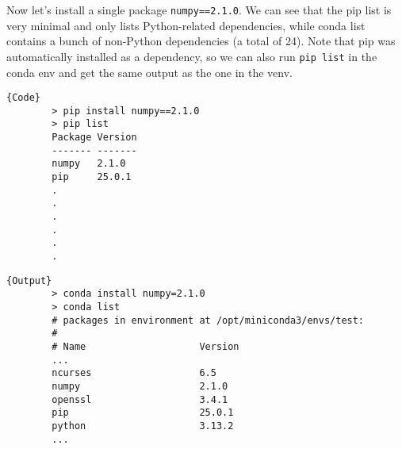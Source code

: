  \begin{example}
    Now let's install a single package \texttt{numpy==2.1.0}. We can see that the pip list is very minimal and only lists Python-related dependencies, while conda list contains a bunch of non-Python dependencies (a total of 24). Note that pip was automatically installed as a dependency, so we can also run \texttt{pip list} in the conda env and get the same output as the one in the venv.  
    
    \noindent\begin{minipage}{.35\textwidth}
      \begin{lstlisting}[]{Code} 
        > pip install numpy==2.1.0
        > pip list
        Package Version
        ------- -------
        numpy   2.1.0
        pip     25.0.1
        .
        .
        .
        .
        .
        .
      \end{lstlisting}
      \end{minipage}
      \hfill
      \begin{minipage}{.64\textwidth}
      \begin{lstlisting}[]{Output}
        > conda install numpy=2.1.0
        > conda list
        # packages in environment at /opt/miniconda3/envs/test:
        #
        # Name                    Version      
        ...
        ncurses                   6.5         
        numpy                     2.1.0       
        openssl                   3.4.1       
        pip                       25.0.1      
        python                    3.13.2      
        ...
      \end{lstlisting}
    \end{minipage}
  \end{example}

